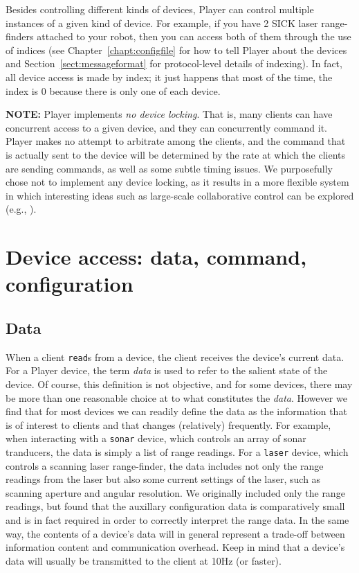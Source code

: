 \documentclass[11pt]{report}
\begin{document}
Besides controlling different kinds of devices, Player can control multiple
instances of a given kind of device.  For example, if you have 2 SICK laser
range-finders attached to your robot, then you can access both of them through
the use of indices (see Chapter~\ref{chapt:configfile} for how to tell Player
about the devices and Section~\ref{sect:messageformat} for protocol-level
details of indexing).  In fact, all device access is made by index; it just
happens that most of the time, the index is $0$ because there is only one
of each device.

{\bf NOTE:} Player implements {\em no device locking}.  That is, many
clients can have concurrent access to a given device, and they can
concurrently command it.  Player makes no attempt to arbitrate among
the clients, and the command that is actually sent to the device will
be determined by the rate at which the clients are sending commands,
as well as some subtle timing issues.  We purposefully chose not to
implement any device locking, as it results in a more flexible system
in which interesting ideas such as large-scale collaborative control
can be explored (e.g., \cite{GerkeyMataricSukhatme02}).

\section{Device access: data, command, configuration}
\label{sect:overview-device-ops}
\subsection*{Data}
When a client {\tt read}s from a device, the client receives the device's
current data.  For a Player device, the term {\em data} is used to refer to
the salient state of the device.  Of course, this definition is not objective,
and for some devices, there may be more than one reasonable choice at to what
constitutes the {\em data}.  However we find that for most devices we can
readily define the data as the information that is of interest to clients
and that changes (relatively) frequently.  For example, when interacting
with a {\tt sonar} device, which controls an array of sonar tranducers,
the data is simply a list of range readings.  For a {\tt laser} device,
which controls a scanning laser range-finder, the data includes not only the
range readings from the laser but also some current settings of the laser,
such as scanning aperture and angular resolution.  We originally included
only the range readings, but found that the auxillary configuration data is
comparatively small and is in fact required in order to correctly interpret
the range data.  In the same way,  the contents of a device's data will 
in general represent a trade-off between information content and communication
overhead.  Keep in mind that a device's data will usually be transmitted to 
the client at 10Hz (or faster).
\end{document}

